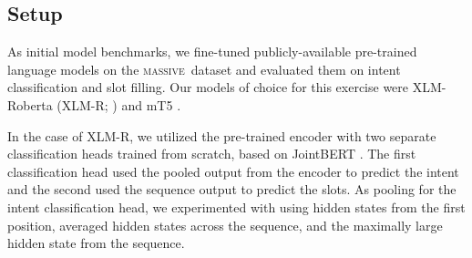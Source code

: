 \documentclass[11pt]{article}
\newcommand{\M}{\textsc{massive}}
\begin{document}
\subsection{Setup}\label{sect:setup}

As initial model benchmarks, we fine-tuned publicly-available pre-trained language models on the \M~dataset and evaluated them on intent classification and slot filling.
Our models of choice for this exercise were XLM-Roberta (XLM-R; \citealt{conneau-etal-2020-unsupervised}) and mT5 \citep{xue-etal-2021-mt5}.

In the case of XLM-R, we utilized the pre-trained encoder with two separate classification heads trained from scratch, based on JointBERT \citep{Chen2019BERTFJ}. The first classification head used the pooled output from the encoder to predict the intent and the second used the sequence output to predict the slots. As pooling for the intent classification head, we experimented with using hidden states from the first position, averaged hidden states across the sequence, and the maximally large hidden state from the sequence.
\end{document}
